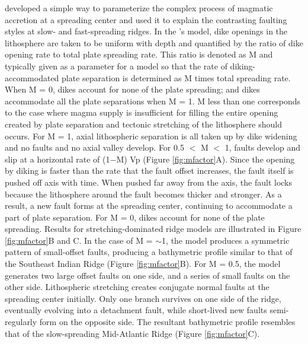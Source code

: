 \documentclass[letterpaper,12pt,notitle]{memphisthesis}                     %
\begin{document}
\citet{Buck1998} developed a simple way to parameterize the complex process of magmatic accretion at a spreading center and used it to explain the contrasting faulting styles at slow- and fast-spreading ridges. In the \citet{Buck2005} 's model, dike openings in the lithosphere are taken to be uniform with depth and quantified by the ratio of dike opening rate to total plate spreading rate. This ratio is denoted as M and typically given as a parameter for a model so that the rate of diking-accommodated plate separation is determined as M times total spreading rate. When M = 0, dikes account for none of the plate spreading; and dikes accommodate all the plate separations when M = 1. M less than one corresponds to the case where magma supply is insufficient for filling the entire opening created by plate separation and tectonic stretching of the lithosphere should occurs. For M = 1, axial lithospheric separation is all taken up by dike widening and no faults and no axial valley develop.  For 0.5 $<$ M $<$ 1, faults develop and slip at a horizontal rate of (1$-$M) Vp (Figure \ref{fig:mfactor}A). Since the opening by diking is faster than the rate that the fault offset increases, the fault itself is pushed off axis with time. When pushed far away from the axis, the fault locks because the lithosphere around the fault becomes thicker and stronger. As a result, a new fault forms at the spreading center, continuing to accommodate a part of plate separation. For M = 0, dikes account for none of the plate spreading. Results for stretching-dominated ridge models are illustrated in Figure \ref{fig:mfactor}B and C. In the case of M = $\sim$1, the model produces a symmetric pattern of small-offset faults, producing a bathymetric profile similar to that of the Southeast Indian Ridge (Figure \ref{fig:mfactor}B). For M = 0.5, the model generates two large offset faults on one side, and a series of small faults on the other side. Lithospheric stretching creates conjugate normal faults at the spreading center initially. Only one branch survives on one side of the ridge, eventually evolving into a detachment fault, while short-lived new faults semi-regularly form on the opposite side. The resultant bathymetric profile resembles that of the slow-spreading Mid-Atlantic Ridge (Figure \ref{fig:mfactor}C).
\end{document}
